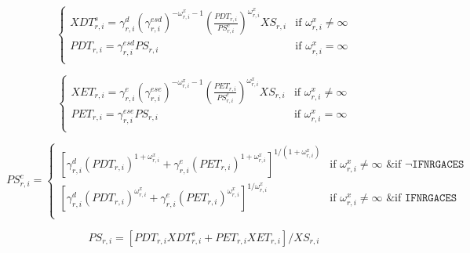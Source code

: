 \documentclass[11pt,letterpaper]{report}
\begin{document}
\begin{equation}
\label{eq:xds}
\begin{cases}
\displaystyle \mathit{XDT}^s_{r,i} =
   \gamma^{\mathit{d}}_{r,i}
   \left( \gamma^{\mathit{esd}}_{r,i}
   \right)^{-\omega^x_{r,i}-1}
   \left( \frac {\mathit{PDT}_{r,i}} {\mathit{PS}^c_{r,i}}
   \right)^{\omega^{\mathit{x}}_{r,\mathit{i}}}
   \mathit{XS_{r,i}}
&  \textrm{if } \omega^x_{r,i} \ne \infty \\
\displaystyle \mathit{PDT}_{r,i} =
   \gamma^{\mathit{esd}}_{r,i} \mathit{PS}_{r,i}
& \textrm{if } \omega^x_{r,i} = \infty \\
\end{cases}
\end{equation}

\begin{equation}
\label{eq:xet}
\begin{cases}
\displaystyle \mathit{XET}_{r,i} =
   \gamma^{\mathit{e}}_{r,i}
   \left( \gamma^{\mathit{ese}}_{r,i} \right)^{-\omega^x_{r,i}-1}
   \left( \frac {\mathit{PET}_{r,i}} {\mathit{PS}^c_{r,i}}
   \right)^{\omega^{\mathit{x}}_{r,\mathit{i}}}
   \mathit{XS}_{r,i}
&  \textrm{if } \omega^x_{r,i} \ne \infty \\
\displaystyle \mathit{PET}_{r,i} =
   \gamma^{\mathit{ese}}_{r,i} \mathit{PS}_{r,i}
&  \textrm{if } \omega^x_{r,i} = \infty \\
\end{cases}
\end{equation}

\begin{equation}
\label{eq:psc}
\mathit{PS}^c_{r,i} =
\begin{cases}
\left[
\gamma^{\mathit{d}}_{r,i} \left( \mathit{PDT}_{r,i} \right)^{1 + \omega^x_{r,i}} +
\gamma^{\mathit{e}}_{r,i} \left( \mathit{PET}_{r,i} \right)^{1 + \omega^x_{r,i}}
\right]^{1/(1 + \omega^x_{r,i})}
&  \textrm{if } \omega^x_{r,i} \ne \infty \textrm{ \& if } \lnot \texttt{IFNRGACES} \\
\left[
\gamma^{\mathit{d}}_{r,i} \left( \mathit{PDT}_{r,i} \right)^{\omega^x_{r,i}} +
\gamma^{\mathit{e}}_{r,i} \left( \mathit{PET}_{r,i} \right)^{\omega^x_{r,i}}
\right]^{1/\omega^x_{r,i}}
&  \textrm{if } \omega^x_{r,i} \ne \infty \textrm{ \& if } \texttt{IFNRGACES} \\
\end{cases}
\end{equation}

\begin{equation}
\label{eq:xs}
\mathit{PS}_{r,i}  =
   \left[\mathit{PDT}_{r,i} \mathit{XDT}^s_{r,i}
+  \mathit{PET}_{r,i} \mathit{XET}_{r,i}\right] \bigg / \mathit{XS}_{r,i}
\end{equation}
\end{document}
